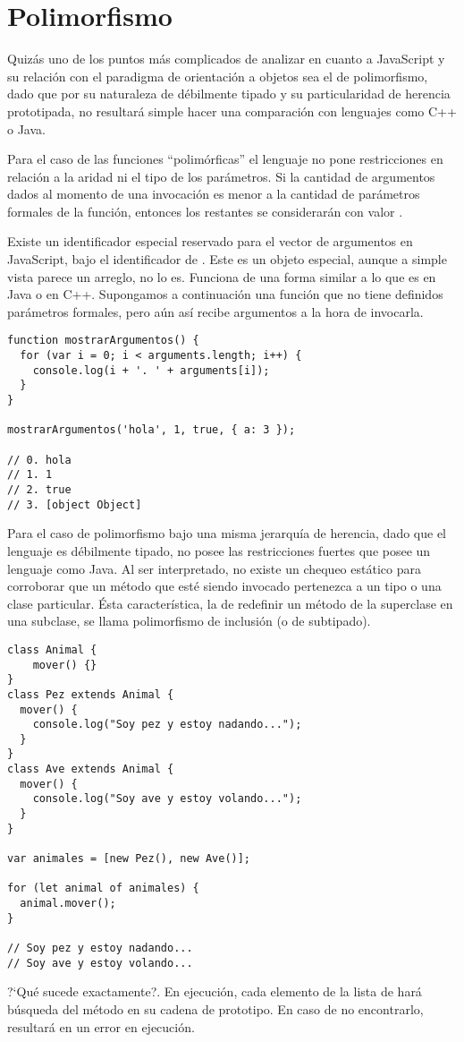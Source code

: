 
\section{Polimorfismo}

Quizás uno de los puntos más complicados de analizar en cuanto a JavaScript y su relación con el paradigma de orientación a objetos sea el de polimorfismo, dado que por su naturaleza de débilmente tipado y su particularidad de herencia prototipada, no resultará simple hacer una comparación con lenguajes como C++ o Java. 

Para el caso de las funciones "`polimórficas"' el lenguaje no pone restricciones en relación a la aridad ni el tipo de los parámetros. Si la cantidad de argumentos dados al momento de una invocación es menor a la cantidad de parámetros formales de la función, entonces los restantes se considerarán con valor . 

Existe un identificador especial reservado para el vector de argumentos en JavaScript, bajo el identificador de . Este es un objeto especial, aunque a simple vista parece un arreglo, no lo es. Funciona de una forma similar a lo que es  en Java o  en C++. Supongamos a continuación una función que no tiene definidos parámetros formales, pero aún así recibe argumentos a la hora de invocarla.

\begin{lstlisting}[title={Analizando \code{arguments}}]
function mostrarArgumentos() {
  for (var i = 0; i < arguments.length; i++) {
    console.log(i + '. ' + arguments[i]);
  }
}

mostrarArgumentos('hola', 1, true, { a: 3 });

// 0. hola
// 1. 1
// 2. true
// 3. [object Object]
\end{lstlisting}

Para el caso de polimorfismo bajo una misma jerarquía de herencia, dado que el lenguaje es débilmente tipado, no posee las restricciones fuertes que posee un lenguaje como Java. Al ser interpretado, no existe un chequeo estático para corroborar que un método que esté siendo invocado pertenezca a un tipo o una clase particular. Ésta característica, la de redefinir un método de la superclase en una subclase, se llama polimorfismo de inclusión (o de subtipado).

\begin{lstlisting}
class Animal {
	mover() {}
}
class Pez extends Animal {
  mover() {
    console.log("Soy pez y estoy nadando...");
  }
}
class Ave extends Animal {
  mover() {
    console.log("Soy ave y estoy volando...");
  }
}

var animales = [new Pez(), new Ave()];

for (let animal of animales) {
  animal.mover();
}

// Soy pez y estoy nadando...
// Soy ave y estoy volando...
\end{lstlisting}

?`Qué sucede exactamente?. En ejecución, cada elemento de la lista de  hará búsqueda del método  en su cadena de prototipo. En caso de no encontrarlo, resultará en un error en ejecución. 
